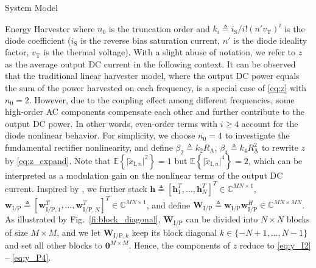 \documentclass[journal]{IEEEtran}
\begin{document}
\begin{section}{System Model}
\begin{subsection}{Energy Harvester}
			where $n_0$ is the truncation order and $k_i \triangleq i_{\mathrm{S}}/i!(n'v_{\mathrm{T}})^i$ is the diode coefficient ($i_{\mathrm{S}}$ is the reverse bias saturation current, $n'$ is the diode ideality factor, $v_{\mathrm{T}}$ is the thermal voltage). With a slight abuse of notation, we refer to $z$ as the average output DC current in the following context. It can be observed that the traditional linear harvester model, where the output DC power equals the sum of the power harvested on each frequency, is a special case of \eqref{eq:z} with $n_0=2$. However, due to the coupling effect among different frequencies, some high-order AC components compensate each other and further contribute to the output DC power. In other words, even-order terms with $i \ge 4$ account for the diode nonlinear behavior. For simplicity, we choose $n_0=4$ to investigate the fundamental rectifier nonlinearity, and define $\beta_2 \triangleq {k_2}{R_{\mathrm{A}}}$, $\beta_4 \triangleq {k_4}{R_{\mathrm{A}}^2}$ to rewrite $z$ by \eqref{eq:z_expand}. Note that $\mathbb{E}\left\{\lvert\tilde{x}_{\mathrm{I},n}\rvert^2\right\}=1$ but $\mathbb{E}\left\{\lvert\tilde{x}_{\mathrm{I},n}\rvert^4\right\}=2$, which can be interpreted as a modulation gain on the nonlinear terms of the output DC current. Inspired by \cite{Huang2017}, we further stack $\boldsymbol{h} \triangleq [\boldsymbol{h}_1^T,\dots,\boldsymbol{h}_N^T]^T \in \mathbb{C}^{MN \times 1}$, $\boldsymbol{w}_{\mathrm{I/P}} \triangleq [\boldsymbol{w}_{\mathrm{I/P},1}^T,\dots,\boldsymbol{w}_{\mathrm{I/P},N}^T]^T \in \mathbb{C}^{MN \times 1}$, and define $\boldsymbol{W}_{\mathrm{I/P}} \triangleq \boldsymbol{w}_{\mathrm{I/P}}\boldsymbol{w}_{\mathrm{I/P}}^H \in \mathbb{C}^{MN \times MN}$. As illustrated by Fig.~\ref{fi:block_diagonal}, $\boldsymbol{W}_{\mathrm{I/P}}$ can be divided into $N \times N$ blocks of size $M \times M$, and we let $\boldsymbol{W}_{\mathrm{I/P},k}$ keep its block diagonal $k \in \{-N+1,\dots,N-1\}$ and set all other blocks to $\boldsymbol{0}^{M \times M}$. Hence, the components of $z$ reduce to \eqref{eq:y_I2} -- \eqref{eq:y_P4}.


\end{subsection}
\end{section}
\end{document}
